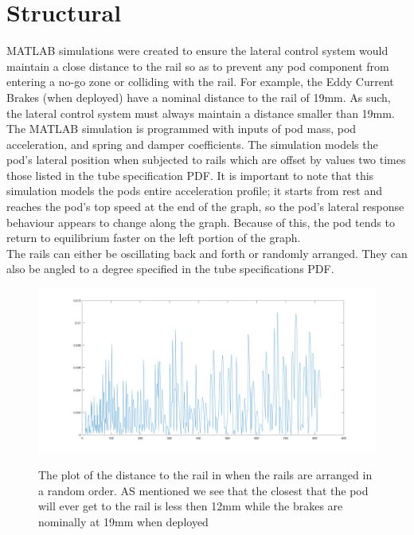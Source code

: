 \documentclass[main.tex]{subfiles}
\begin{document}
    \section{Structural}
    MATLAB simulations were created to ensure the lateral control system would maintain a close distance to the rail so as to prevent any pod component from entering a no-go zone or colliding with the rail. For example, the Eddy Current Brakes (when deployed) have a nominal distance to the rail of 19mm. As such, the lateral control system must always maintain a distance smaller than 19mm.\\
    The MATLAB simulation is programmed with inputs of pod mass, pod acceleration, and spring and damper coefficients. The simulation models the pod's lateral position when subjected to rails which are offset by values two times those listed in the tube specification PDF. It is important to note that this simulation models the pods entire acceleration profile; it starts from rest and reaches the pod's top speed at the end of the graph, so the pod's lateral response behaviour appears to change along the graph. Because of this, the pod tends to return to equilibrium faster on the left portion of the graph. \\
    The rails can either be oscillating back and forth or randomly arranged. They can also be angled to a degree specified in the tube specifications PDF. 
     \begin{figure}[H]
    	\centering
        \includegraphics[width=\linewidth]{images/RandDistToRail}
        \label{fig:RandDistToRail}
        \caption{The plot of the distance to the rail in when the rails are arranged in a random order. AS mentioned we see that the closest that the pod will ever get to the rail is less then 12mm while the brakes are nominally at 19mm when deployed}
    \end{figure}
\end{document}
